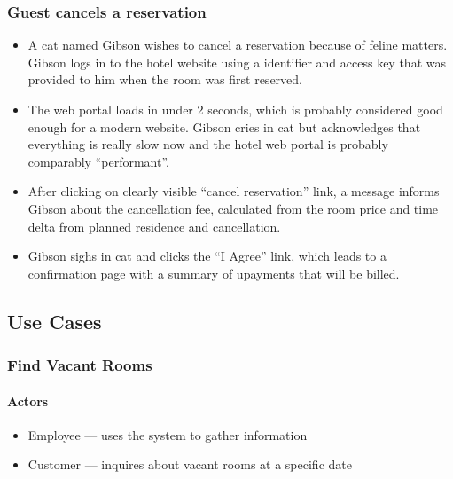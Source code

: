 \subsubsection{Guest cancels a reservation}\label{scenario3}
% 
% 
% 
\begin{itemize}
  \item A cat named Gibson wishes to cancel a reservation because of feline
      matters.  Gibson logs in to the hotel website using a identifier and
        access key that was provided to him when the room was first reserved.

  \item The web portal loads in under 2 seconds, which is probably considered good
        enough for a modern website. Gibson cries in cat but acknowledges that
        everything is really slow now and the hotel web portal is probably
        comparably ``performant''.

  \item After clicking on clearly visible ``cancel reservation'' link, a
      message informs Gibson about the cancellation fee, calculated from the
        room price and time delta from planned residence and cancellation.
      
  \item Gibson sighs in cat and clicks the ``I Agree'' link, which leads to a
      confirmation page with a summary of upayments that will be billed.
\end{itemize}




\subsection{Use Cases}
%
%
%

\subsubsection{Find Vacant Rooms}\label{find-vacant-rooms}

\paragraph{Actors}\label{actors}

\begin{itemize}
\tightlist
\item
  Employee --- uses the system to gather information
\item
  Customer --- inquires about vacant rooms at a specific date
\end{itemize}

